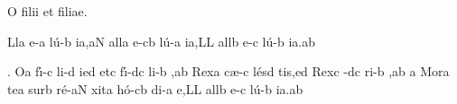 \beginhymn O filii et filiae.

\Internote
\nosolesmescustos
\initiumgregorianum
{}%
\sgn {}Ll\punctum a\egn
\sgn {}e-\punctum a\egn
\sgn l{\'u}-\punctum b\egn
\sgn ia,\clivis aN\egn
\spatium
\sgn {}a{ll}\punctum a\egn
\sgn {}e-\clivis cb\egn
\sgn l{\'u}-\punctum a\egn
\sgn ia,\punctum L\augmentum L\egn
\spatium
\divisiominor
\spatium
\sgn {}a{ll}\punctum b\egn
\sgn {}e-\punctum c\egn
\sgn l{\'u}-\punctum b\egn
\sgn ia.\punctum a\augmentum b\egn
\spatium
\Finisgregoriana

\smallskip

\Internote
\nosolesmescustos
\initiumgregorianum
\sgn {}{\oldstyle 1\rm}.\egn
\spatium
\sgn {}O{}\punctum a\egn
\spatium
\sgn f{\'\i}-\punctum c\egn
\sgn li-\punctum d\egn
\sgn {}i{}\clivis ed\egn
\spatium
\sgn {}et\punctum c\egn
\spatium
\sgn f{\'\i}-\clivis dc\egn
\sgn li-\punctum b\egn
\sgn {}{\ae},\punctum a\augmentum b\egn
\spatium
\divisiominor
\spatium
\sgn Rex\punctum a\egn
\spatium
\sgn c{\ae}-\punctum c\egn
\sgn l{\'e}s\punctum d\egn
\sgn ti{s,}\clivis ed\egn
\spatium
\sgn Rex\punctum c\egn
\spatium
{}-\clivis dc\egn
\sgn ri-\punctum b\egn
\sgn {}{\ae},\punctum a\augmentum b\egn
\spatium
\divisiominor
\spatium
\custos a\lineaproxima
\sgn M{o}r\punctum a\egn
\sgn te{}\punctum a\egn
\spatium
\sgn sur\punctum b\egn
\sgn r{\'e}-\clivis aN\egn
\sgn xit\punctum a\egn
\spatium
\sgn h{\'o}-\clivis cb\egn
\sgn di-\punctum a\egn
\sgn {}e,\punctum L\augmentum L\egn
\spatium
\divisiominor
\spatium
\sgn {}a{ll}\punctum b\egn
\sgn {}e-\punctum c\egn
\sgn l{\'u}-\punctum b\egn
\sgn ia.\punctum a\augmentum b\egn
\spatium
\Finisgregoriana

\medskip

\beginlyrics

